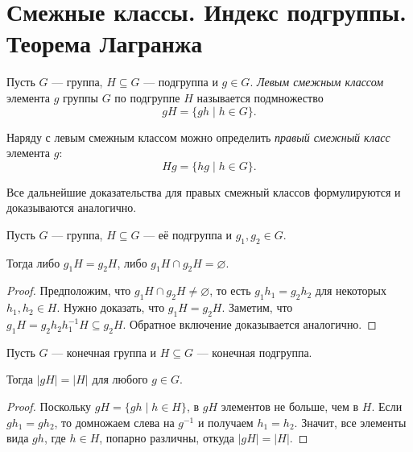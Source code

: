 \section{Смежные классы. Индекс подгруппы. Теорема Лагранжа}

\begin{definition}
    Пусть $G$ --- группа, $H \subseteq G$ --- подгруппа и $g \in G$. \textit{Левым смежным классом} элемента $g$ группы $G$ по подгруппе $H$ называется подмножество
    \begin{equation*}
        gH = \{gh \mid h \in G\}
    .\end{equation*}

    Наряду с левым смежным классом можно определить \textit{правый смежный класс} элемента $g$:
    \begin{equation*}
        Hg = \{hg \mid h \in G\}
    .\end{equation*}
\end{definition}

Все дальнейшие доказательства для правых смежный классов формулируются и доказываются аналогично.

\begin{lemma}
    Пусть $G$ --- группа, $H \subseteq G$ --- её подгруппа и $g_1, g_2 \in G$.

    Тогда либо $g_1 H = g_2 H$, либо $g_1 H \cap g_2 H = \varnothing$.
\end{lemma}

\begin{proof}
    Предположим, что $g_1 H \cap g_2 H \neq \varnothing$, то есть $g_1 h_1 = g_2 h_2$ для некоторых $h_1, h_2 \in H$. Нужно доказать, что $g_1 H = g_2 H$. Заметим, что $g_1 H = g_2 h_2 h_1^{-1} H \subseteq g_2 H$. Обратное включение доказывается аналогично.
\end{proof}

\begin{lemma}
    Пусть $G$ --- конечная группа и $H \subseteq G$ --- конечная подгруппа.

    Тогда $\left|gH\right| = \left|H\right|$ для любого $g \in G$.
\end{lemma}

\begin{proof}
    Поскольку $gH = \{gh \mid h \in H\}$, в $gH$ элементов не больше, чем в $H$.
    Если $g h_1 = gh_2$, то домножаем слева на $g^{-1}$ и получаем $h_1 = h_2$. Значит, все элементы вида $gh$, где $h \in H$, попарно различны, откуда $\left|gH\right| = \left|H\right|$.
\end{proof}

